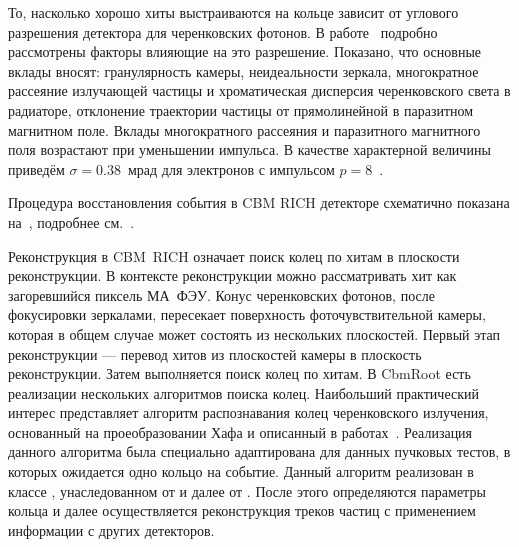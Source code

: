 То, насколько хорошо хиты выстраиваются на кольце зависит от углового разрешения детектора для черенковских фотонов. В работе~\cite{TDR_RICH, KOPFERDISS} подробно рассмотрены факторы влияющие на это разрешение. Показано, что основные вклады вносят: гранулярность камеры, неидеальности зеркала, многократное рассеяние излучающей частицы и хроматическая дисперсия черенковского света в радиаторе, отклонение траектории частицы от прямолинейной в паразитном магнитном поле.
Вклады многократного рассеяния и паразитного магнитного поля возрастают при уменьшении импульса. В качестве характерной величины приведём $\sigma = 0.38$~мрад для электронов с импульсом $p=8$~\GeVoverC{}.


\bigskip

Процедура восстановления события в CBM RICH детекторе схематично показана на~, подробнее см.~\cite{RICHreco}.

Реконструкция в CBM~RICH означает поиск колец по хитам в плоскости реконструкции. В контексте реконструкции можно рассматривать хит как загоревшийся пиксель МА~ФЭУ. Конус черенковских фотонов, после фокусировки зеркалами, пересекает поверхность фоточувствительной камеры, которая в общем случае может состоять из нескольких плоскостей. Первый этап реконструкции --- перевод хитов из плоскостей камеры в плоскость реконструкции. Затем выполняется поиск колец по хитам. В CbmRoot есть реализации нескольких алгоритмов поиска колец. Наибольший практический интерес представляет алгоритм распознавания колец черенковского излучения, основанный на проеобразовании Хафа и описанный в работах~\cite{RECOPEPAN, RECO2}. Реализация данного алгоритма была специально адаптирована для данных пучковых тестов, в которых ожидается одно кольцо на событие. Данный алгоритм реализован в классе , унаследованном от  и далее от . После этого определяются параметры кольца и далее осуществляется реконструкция треков частиц с применением информации с других детекторов.

